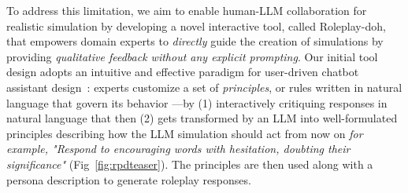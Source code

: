 \documentclass[11pt]{article}
\begin{document}
To address this limitation, we aim to enable human-LLM collaboration for realistic simulation by developing a novel interactive tool, called Roleplay-doh, that empowers domain experts to \textit{directly} guide the creation of simulations by providing \textit{qualitative feedback without any explicit prompting}. 
Our initial tool design adopts an intuitive and effective paradigm for user-driven chatbot assistant design~\cite{petridis2023constitutionmaker}: experts customize a set of \textit{principles}, or rules written in natural language that govern its behavior \cite{bai2022constitutional}—by (1) interactively critiquing responses in natural language that then (2) gets transformed by an LLM into well-formulated principles describing how the LLM simulation should act from now on \textit{for example, "Respond to encouraging words with hesitation, doubting their significance"} (Fig~\ref{fig:rpdteaser}). The principles are then used along with a persona description to generate roleplay responses. 
\end{document}
